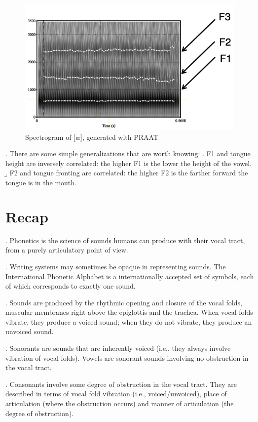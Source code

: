 \documentclass[11pt, oneside]{article}   	%
\begin{document}
\begin{figure}[h!]
\centering
\includegraphics[scale=0.5]{formants}
\caption{Spectrogram of [\ae], generated with PRAAT}
\end{figure}

\ex. There are some simple generalizations that are worth knowing:
\a. F1 and tongue height are inversely correlated: the higher F1 is the lower the height of the vowel.
\b. F2 and tongue fronting are correlated: the higher F2 is the farther forward the tongue is in the mouth.

\section{Recap}

\ex. Phonetics is the science of sounds humans can produce with their vocal tract, from a purely articulatory point of view. 

\ex. Writing systems may sometimes be opaque in representing sounds. The International Phonetic Alphabet is a internationally accepted set of symbols, each of which corresponds to exactly one sound.

\ex. Sounds are produced by the rhythmic opening and closure of the vocal folds, muscular membranes right above the epiglottis and the trachea. When vocal folds vibrate, they produce a voiced sound; when they do not vibrate, they produce an unvoiced sound.

\ex. Sonorants are sounds that are inherently voiced (i.e., they always involve vibration of vocal folds). Vowels are sonorant sounds involving no obstruction in the vocal tract.

\ex. Consonants involve some degree of obstruction in the vocal tract. They are described in terms of vocal fold vibration (i.e., voiced/unvoiced), place of articulation (where the obstruction occurs) and manner of articulation (the degree of obstruction).
\end{document}
